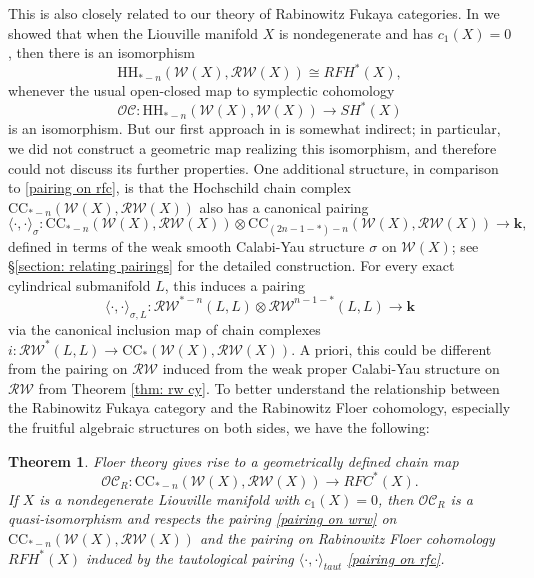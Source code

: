 \documentclass[11pt]{amsproc}
\def\K{{\mathbf{k}}}
\def\w{\mathcal{W}(E)}
\def\oc{\mathcal{OC}}
\def\r#1{\mathrm{#1}}
\def\w{\mathcal{W}}
\def\rw{\mathcal{RW}}
\newtheorem{thm}[lem]{Theorem}
\theoremstyle{remark}
\numberwithin{equation}{section}
\begin{document}
This is also closely related to our theory of Rabinowitz Fukaya categories.
In \cite[Theorem 1.6]{GGV} we showed that when the Liouville manifold $X$ is nondegenerate and has $c_{1}(X)=0$,
then there is an isomorphism
\begin{equation}
\r{HH}_{*-n}(\w(X), \rw(X)) \cong RFH^{*}(X),
\end{equation}
whenever the usual open-closed map to symplectic cohomology
\[
\oc: \r{HH}_{*-n}(\w(X), \w(X)) \to SH^{*}(X)
\]
is an isomorphism.
But our first approach in \cite{GGV} is somewhat indirect; 
in particular, we did not construct a geometric map realizing this isomorphism, 
and therefore could not discuss its further properties.
One additional structure, in comparison to \eqref{pairing on rfc}, is that the Hochschild chain complex $\r{CC}_{*-n}(\w(X), \rw(X))$ also has a canonical pairing
\begin{equation}\label{pairing on wrw}
\langle \cdot, \cdot \rangle_{\sigma}: \r{CC}_{*-n}(\w(X), \rw(X)) \otimes \r{CC}_{(2n-1-*)-n}(\w(X), \rw(X)) \to \K,
\end{equation}
defined in terms of the weak smooth Calabi-Yau structure $\sigma$ on $\w(X)$;
see \S\ref{section: relating pairings} for the detailed construction.
For every exact cylindrical submanifold $L$, 
this induces a pairing
\begin{equation}\label{pairing on wrw for L}
\langle \cdot, \cdot \rangle_{\sigma, L}: \rw^{*-n}(L, L) \otimes \rw^{n-1-*}(L, L) \to \K
\end{equation}
via the canonical inclusion map of chain complexes $i: \rw^{*}(L, L) \to \r{CC}_{*}(\w(X), \rw(X))$.
A priori, this could be different from the pairing on $\rw$ induced from the weak proper Calabi-Yau structure on $\rw$ from Theorem \ref{thm: rw cy}.
To better understand the relationship between the Rabinowitz Fukaya category and the Rabinowitz Floer cohomology,
especially the fruitful algebraic structures on both sides, 
we have the following:

\begin{thm}\label{thm: oc respects pairing}
Floer theory gives rise to a geometrically defined chain map
\begin{equation}\label{wrw oc1}
\oc_{R}: \r{CC}_{*-n}(\w(X), \rw(X)) \to RFC^{*}(X).
\end{equation}
If $X$ is a nondegenerate Liouville manifold with $c_{1}(X) = 0$,
then $\oc_{R}$ is a quasi-isomorphism and respects the pairing \eqref{pairing on wrw} on $\r{CC}_{*-n}(\w(X), \rw(X))$ and the pairing on Rabinowitz Floer cohomology $RFH^{*}(X)$ induced by the tautological pairing $\langle \cdot, \cdot \rangle_{taut}$ \eqref{pairing on rfc}.
\end{thm}
\end{document}
